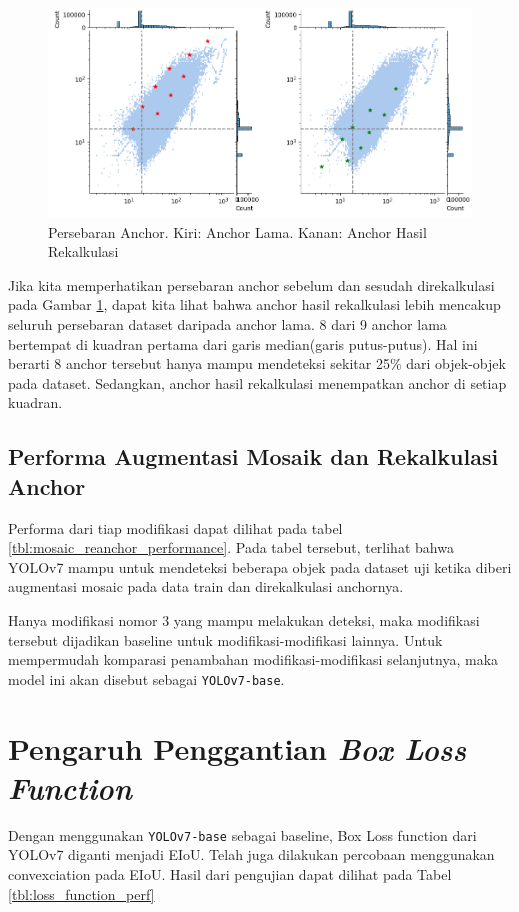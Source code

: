   
  \vspace{1ex}
  \begin{figure}[ht]
    \centering
    \includegraphics[width=\textwidth]{figures/anchor-dist-2.png}
    \caption{Persebaran Anchor. Kiri: Anchor Lama. Kanan: Anchor Hasil Rekalkulasi}
    \label{fig:anchor-dist}
  \end{figure}

  Jika kita memperhatikan persebaran anchor sebelum dan sesudah direkalkulasi pada Gambar \ref{fig:anchor-dist},
  dapat kita lihat bahwa anchor hasil rekalkulasi lebih mencakup seluruh persebaran dataset daripada anchor lama.
  8 dari 9 anchor lama bertempat di kuadran pertama dari garis median(garis putus-putus).
  Hal ini berarti 8 anchor tersebut hanya mampu mendeteksi sekitar 25\% dari objek-objek pada dataset.
  Sedangkan, anchor hasil rekalkulasi menempatkan anchor di setiap kuadran.



\subsection{Performa Augmentasi Mosaik dan Rekalkulasi Anchor}
  Performa dari tiap modifikasi dapat dilihat pada tabel \ref{tbl:mosaic_reanchor_performance}.
  Pada tabel tersebut, terlihat bahwa YOLOv7 mampu untuk mendeteksi beberapa objek pada dataset uji ketika diberi 
  augmentasi mosaic pada data train dan direkalkulasi anchornya.
  

  Hanya modifikasi nomor 3 yang mampu melakukan deteksi, maka 
  modifikasi tersebut dijadikan baseline untuk modifikasi-modifikasi lainnya.
  Untuk mempermudah komparasi penambahan modifikasi-modifikasi selanjutnya,
  maka model ini akan disebut sebagai \verb*|YOLOv7-base|.

\section{Pengaruh Penggantian \emph{Box Loss Function}}
Dengan menggunakan \verb*|YOLOv7-base| sebagai baseline, 
Box Loss function dari YOLOv7 diganti menjadi EIoU.
Telah juga dilakukan percobaan menggunakan convexciation pada EIoU.
Hasil dari pengujian dapat dilihat pada Tabel \ref{tbl:loss_function_perf}

